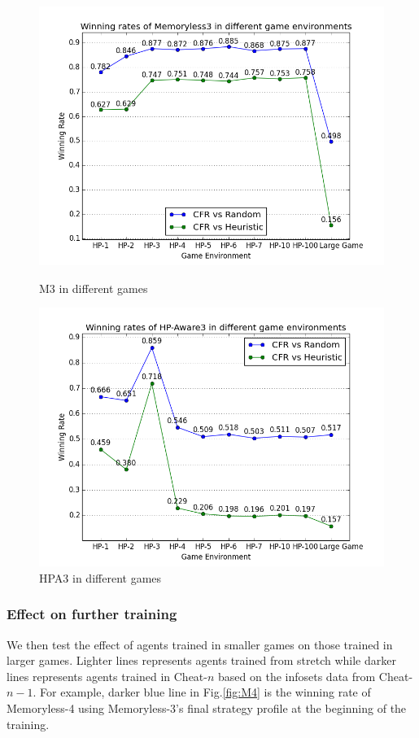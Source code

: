 \documentclass[runningheads]{llncs}
\begin{document}
    \begin{figure}[htbp]
    \centering
    \begin{minipage}[t]{0.48\textwidth}
        \centering
        \includegraphics[width=\linewidth]{Memoryless_3_compare_bots.png}
        \caption{M3 in different games}
    \end{minipage}
    \begin{minipage}[t]{0.48\textwidth}
        \centering
        \includegraphics[width=\linewidth]{HPA_3_compare_bots.png}
        \caption{HPA3 in different games}
    \end{minipage}
    \end{figure}

    \subsubsection{Effect on further training}
    We then test the effect of agents trained in smaller games on those trained in larger games. Lighter lines represents agents trained from stretch while darker lines represents agents trained in Cheat-$n$ based on the infosets data from Cheat-$n-1$. For example, darker blue line in Fig.\ref{fig:M4} is the winning rate of Memoryless-4 using Memoryless-3's final strategy profile at the beginning of the training.
    
\end{document}
